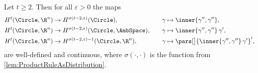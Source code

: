 \begin{corollary}\label{cor:gamma''gamma''}
    Let $t \geq 2$. 
    Then for all $\varepsilon > 0$ the maps 
    \begin{alignat*}{2}
        H^{t}(\Circle,\R^n)
        &\to 
        H^{\sigma(t-2,\varepsilon)}(\Circle),
        \quad
        &\gamma &\mapsto \inner{\gamma'',\gamma''},
        \\
        H^{t}(\Circle,\R^n)
        &\to 
        H^{\sigma(t-2,\varepsilon)}(\Circle,\AmbSpace),
        \quad
        &\gamma &\mapsto \inner{\gamma'',\gamma''} \, \gamma',
        \\
        H^{t}(\Circle,\R^n)
        &\to 
        H^{\sigma(t-2,\varepsilon)-1}(\Circle,\R^n),
        \quad
        &\gamma &\mapsto \pars[\big]{ \inner{ \gamma'',\gamma''} \, \gamma'}',
    \end{alignat*}
    are well-defined and continuous, where $\sigma(\cdot,\cdot)$ is the function from \cref{lem:ProductRuleAsDistribution}.
\end{corollary}
